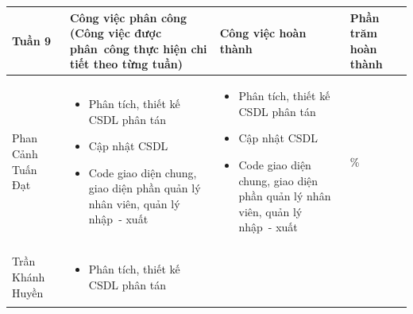 \documentclass[a4paper,12pt]{report}
\begin{document}
\noindent
\begin{center}
    \begin{longtable}{|>{\centering\arraybackslash}p{3cm}|
        >{\centering\arraybackslash}p{5.5cm}|
        >{\centering\arraybackslash}p{5.5cm}|
        >{\centering\arraybackslash}p{1.5cm}|}
        \hline
        \textbf{Tuần 9}                                                                                                               &
        \textbf{Công việc phân công \newline
            (Công việc được phân~công thực hiện chi tiết theo từng tuần)
        }                                                                                                                             &
        \textbf{Công việc hoàn thành}                                                                                                 &
        \textbf{Phần trăm hoàn thành}                                                                                                         \\
        \hline
        Phan Cảnh Tuấn Đạt                                                                                                            &
        \begin{itemize}
            \item Phân tích, thiết kế CSDL phân tán
            \item Cập nhật CSDL
            \item Code giao diện chung, giao diện phần quản lý nhân viên, quản lý nhập~- xuất
        \end{itemize}                                             &
        \begin{itemize}
            \item Phân tích, thiết kế CSDL phân tán
            \item Cập nhật CSDL
            \item Code giao diện chung, giao diện phần quản lý nhân viên, quản lý nhập~- xuất
        \end{itemize}
                                                                                                                                      & 100\% \\
        \hline
        Trần Khánh Huyền                                                                                                              &
        \begin{itemize}
            \item Phân tích, thiết kế CSDL phân tán

\end{itemize}
\end{longtable}
\end{center}
\end{document}
